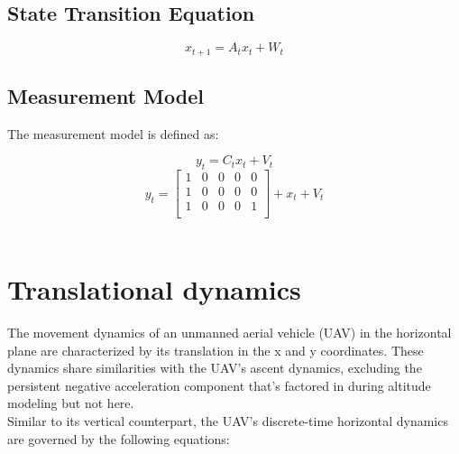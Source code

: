 \documentclass{article}
\begin{document}
\subsection{State Transition Equation}
\begin{equation}
    {x}_{t+1} = A_t {x}_t + W_t
\end{equation}

\subsection{Measurement Model}
The measurement model is defined as:

\begin{equation}
y_t = C_t x_t + V_t
\end{equation}
\begin{equation}
    y_t  = 
    \begin{bmatrix}
        1 & 0 & 0 & 0 & 0 \\
        1 & 0 & 0 & 0 & 0 \\
        1 & 0 & 0 & 0 & 1 \\
    \end{bmatrix}
    + x_t + V_t
\end{equation}
\\

\noindent
\section{Translational dynamics}

The movement dynamics of an unmanned aerial vehicle (UAV) in the horizontal
plane are characterized by its translation in the x and y coordinates. 
These dynamics share similarities with the UAV's ascent dynamics, 
excluding the persistent negative acceleration component that's factored 
in during altitude modeling but not here.
\\

\noindent
Similar to its vertical counterpart, the UAV's discrete-time horizontal 
dynamics are governed by the following equations:
\end{document}
